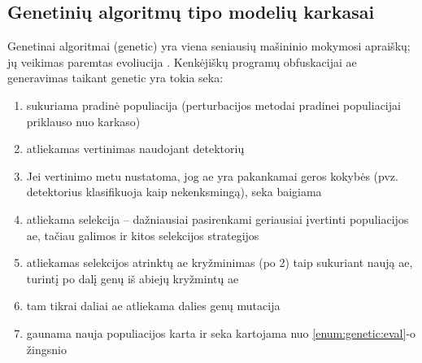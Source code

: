 \subsection{Genetinių algoritmų tipo modelių karkasai}\label{sec:literature:genetic}

Genetinai algoritmai (\acs{genetic}) yra viena seniausių mašininio mokymosi apraiškų; jų veikimas paremtas evoliucija \citeplace. Kenkėjiškų programų obfuskacijai \acs{ae} generavimas taikant \acs{genetic} yra tokia seka:
\begin{enumerate}
    \item sukuriama pradinė populiacija (perturbacijos metodai pradinei populiacijai priklauso nuo karkaso)
    \item atliekamas vertinimas naudojant detektorių\label{enum:genetic:eval}
    \item Jei vertinimo metu nustatoma, jog \acs{ae} yra pakankamai geros kokybės (pvz. detektorius klasifikuoja kaip nekenksmingą), seka baigiama
    \item atliekama selekcija -- dažniausiai pasirenkami geriausiai įvertinti populiacijos \acs{ae}, tačiau galimos ir kitos selekcijos strategijos
    \item atliekamas selekcijos atrinktų \acs{ae} kryžminimas (po 2) taip sukuriant naują \acs{ae}, turintį po dalį genų iš abiejų kryžmintų \acs{ae}
    \item tam tikrai daliai \ac{ae} atliekama dalies genų mutacija
    \item gaunama nauja populiacijos karta ir seka kartojama nuo \ref{enum:genetic:eval}-o žingsnio
\end{enumerate}
\cite{yusteOptimizationCodeCaves2022}